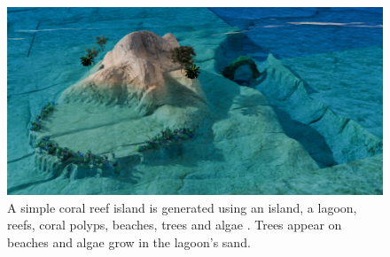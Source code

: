 \begin{figure}[H]
    \includegraphics{multiScene1 v2 final 1.png}
    \caption{A simple coral reef island is generated using an island, a lagoon, reefs, coral polyps, beaches, trees and algae . Trees appear on beaches and algae grow in the lagoon's sand.}
    \label{fig:env-obj-coral-island-scene}
\end{figure}










































